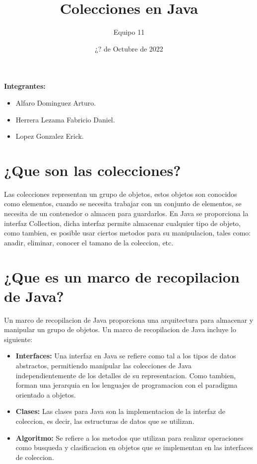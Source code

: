 \documentclass[12pt, letterpaper]{article} %
\title{Colecciones en Java}
\author{Equipo 11}
\date{¿? de Octubre de 2022}
\begin{document}
\maketitle %


\textbf{Integrantes:}
\begin{itemize}
    \item Alfaro Dominguez Arturo.
    \item Herrera Lezama Fabricio Daniel.
    \item Lopez Gonzalez Erick.
\end{itemize}

\section*{¿Que son las colecciones?}
Las colecciones representan un grupo de objetos, estos objetos son conocidos como elementos, cuando se necesita trabajar con un conjunto de elementos, se necesita de un contenedor o almacen para guardarlos. En Java se proporciona la interfaz Collection, dicha interfaz permite almacenar cualquier tipo de objeto, como tambien, es posible usar ciertos metodos para su manipulacion, tales como: anadir, eliminar, conocer el tamano de la coleccion, etc. 

\section*{¿Que es un marco de recopilacion de Java?}

Un marco de recopilacion de Java proporciona una arquitectura para almacenar y manipular un grupo de objetos. Un marco de recopilacion de Java incluye lo siguiente:

\begin{itemize}
    \item \textbf{Interfaces:} Una interfaz en Java se refiere como tal a los tipos de datos abstractos, permitiendo manipular las colecciones de Java independientemente de los detalles de su representacion. Como tambien, forman una jerarquia en los lenguajes de programacion con el paradigma orientado a objetos.
    \item \textbf{Clases:} Las clases para Java son la implementacion de la interfaz de coleccion, es decir, las estructuras de datos que se utilizan.
    \item \textbf{Algoritmo:} Se refiere a los metodos que utilizan para realizar operaciones como busqueda y clasificacion en objetos que se implementan en las interfaces de coleccion.
\end{itemize}
\end{document}
